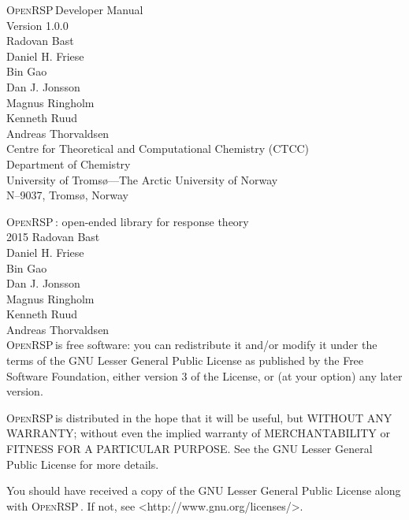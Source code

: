 \documentclass[a4paper,11pt,final]{article}
\begin{document}
\def\LibName{\textsc{OpenRSP}\,}
\def\LibVersion{1.0.0\,}
\def\LibAuthor{Radovan Bast\\
               Daniel H. Friese\\
               Bin Gao\\
               Dan J. Jonsson\\
               Magnus Ringholm\\
               Kenneth Ruud\\
               Andreas Thorvaldsen\,}

\begin{titlepage}
  \centering
  \vspace*{\fill}
  {\huge\LibName Developer Manual\\
   Version \LibVersion}\\
  \vspace*{\fill}
  {\Large\LibAuthor}\\
  \vspace*{\fill}
  {\Large Centre for Theoretical and Computational Chemistry (CTCC)\\
   Department of Chemistry\\
   University of Troms{\o}---The Arctic University of Norway\\
   N--9037, Troms{\o}, Norway}
  \vspace*{\fill}
\end{titlepage}

\clearpage

\begingroup
\setlength{\parindent}{0pt}
\setlength{\parskip}{\baselineskip}
\LibName: open-ended library for response theory\\
\textcopyright{} 2015 \LibAuthor\\

\LibName is free software: you can redistribute it and/or modify
it under the terms of the GNU Lesser General Public License as
published by the Free Software Foundation, either version 3 of
the License, or (at your option) any later version.

\LibName is distributed in the hope that it will be useful,
but WITHOUT ANY WARRANTY; without even the implied warranty of
MERCHANTABILITY or FITNESS FOR A PARTICULAR PURPOSE. See the
GNU Lesser General Public License for more details.

You should have received a copy of the GNU Lesser General Public
License along with \LibName. If not, see
<http://www.gnu.org/licenses/>.
\end{document}
